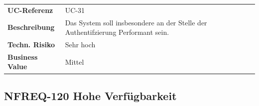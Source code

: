 \begin{longtable}[c]{@{}ll@{}}
\toprule
\begin{minipage}[t]{0.20\columnwidth}\raggedright\strut
\textbf{UC-Referenz}
\strut\end{minipage} &
\begin{minipage}[t]{0.74\columnwidth}\raggedright\strut
UC-31
\strut\end{minipage}\tabularnewline
\begin{minipage}[t]{0.20\columnwidth}\raggedright\strut
\textbf{Beschreibung}
\strut\end{minipage} &
\begin{minipage}[t]{0.74\columnwidth}\raggedright\strut
Das System soll insbesondere an der Stelle der Authentifzierung
Performant sein.
\strut\end{minipage}\tabularnewline
\begin{minipage}[t]{0.20\columnwidth}\raggedright\strut
\textbf{Techn. Risiko}
\strut\end{minipage} &
\begin{minipage}[t]{0.74\columnwidth}\raggedright\strut
Sehr hoch
\strut\end{minipage}\tabularnewline
\begin{minipage}[t]{0.20\columnwidth}\raggedright\strut
\textbf{Business Value}
\strut\end{minipage} &
\begin{minipage}[t]{0.74\columnwidth}\raggedright\strut
Mittel
\strut\end{minipage}\tabularnewline
\bottomrule
\end{longtable}

\subsection{NFREQ-120 Hohe
Verfügbarkeit}\label{nfreq-120-hohe-verfuxfcgbarkeit}

